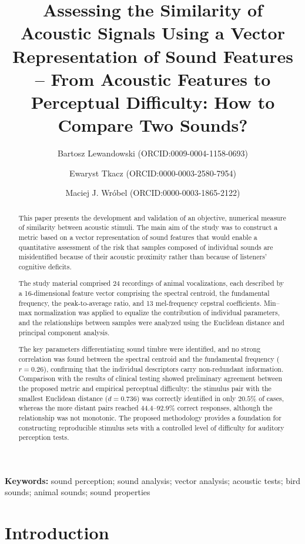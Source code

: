 \documentclass{article}
\title{Assessing the Similarity of Acoustic Signals Using a Vector Representation of Sound Features
\\-- From Acoustic Features to Perceptual Difficulty: How to Compare Two Sounds?
}
\author[1,*]{Bartosz Lewandowski \small{(ORCID:0009-0004-1158-0693)}}
\author[2]{Ewaryst Tkacz \small{(ORCID:0000-0003-2580-7954)}}
\author[3]{Maciej J. Wróbel \small{(ORCID:0000-0003-1865-2122)}}
\affil[1,2]{Department of Clinical Engineering, Academy of Silesia in Katowice}
\affil[3]{Department of Otolaryngology and Oncological Laryngology Collegium Medicum NCU}
\affil[*]{Corresponding author: Bartosz Lewandowski, Ph.D., bartosz.lewandowski@akademiaslaska.pl}
\date{}  %
\begin{document}
\maketitle

\begin{abstract}

    This paper presents the development and validation of an objective, numerical measure of similarity between acoustic stimuli. The main aim of the study was to construct a metric based on a vector representation of sound features that would enable a quantitative assessment of the risk that samples composed of individual sounds are misidentified because of their acoustic proximity rather than because of listeners' cognitive deficits.

    The study material comprised 24 recordings of animal vocalizations, each described by a 16-dimensional feature vector comprising the spectral centroid, the fundamental frequency, the peak-to-average ratio, and 13 mel-frequency cepstral coefficients. Min--max normalization was applied to equalize the contribution of individual parameters, and the relationships between samples were analyzed using the Euclidean distance and principal component analysis.


    The key parameters differentiating sound timbre were identified, and no strong correlation was found between the spectral centroid and the fundamental frequency ($r = 0.26$), confirming that the individual descriptors carry non-redundant information. Comparison with the results of clinical testing showed preliminary agreement between the proposed metric and empirical perceptual difficulty: the stimulus pair with the smallest Euclidean distance ($d = 0.736$) was correctly identified in only $20.5\%$ of cases, whereas the more distant pairs reached $44.4$--$92.9\%$ correct responses, although the relationship was not monotonic. The proposed methodology provides a foundation for constructing reproducible stimulus sets with a controlled level of difficulty for auditory perception tests.

\end{abstract}


\vspace{1em}

\noindent\textbf{Keywords:} sound perception; sound analysis; vector analysis; acoustic tests; bird sounds; animal sounds; sound properties

\section{Introduction}
\end{document}
